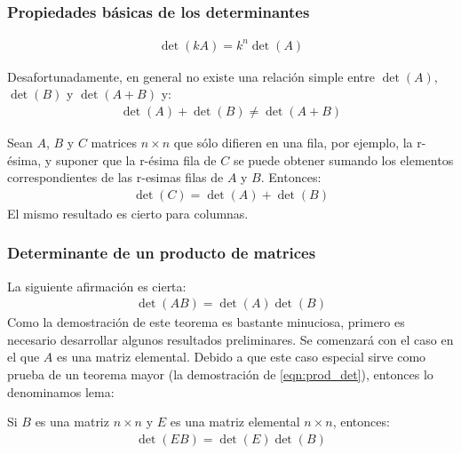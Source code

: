 \documentclass[a4paper,12pt]{article}
\begin{document}
\subsubsection{Propiedades básicas de los determinantes}

\begin{concept}
  \begin{align*}
    \det(kA)=k^n\det(A)
  \end{align*}
\end{concept}

Desafortunadamente, en general no existe una relación simple entre
$\det(A)$, $\det(B)$ y $\det(A+B)$ y:
\begin{align*}
  \det(A) + \det(B) \ne \det(A+B)
\end{align*}

\begin{theorem}
  Sean $A$, $B$ y $C$ matrices $n\times n$ que sólo difieren en una fila, por
  ejemplo, la r-ésima, y suponer que la r-ésima fila de $C$ se puede obtener
  sumando los elementos correspondientes de las r-esimas filas de $A$ y
  $B$. Entonces:
  \begin{align*}
    \det(C)=\det(A)+\det(B)
  \end{align*}
  El mismo resultado es cierto para columnas.
  \label{theo:det_suma}
\end{theorem}

\subsubsection{Determinante de un producto de matrices}

La siguiente afirmación es cierta:
\begin{align}
  \det(AB)=\det(A)\det(B)
  \label{eqn:prod_det}
\end{align}
Como la demostración de este teorema es bastante minuciosa, primero es
necesario desarrollar algunos resultados preliminares. Se comenzará con el
caso en el que $A$ es una matriz elemental. Debido a que este caso especial
sirve como prueba de un teorema mayor (la demostración de
\eqref{eqn:prod_det}), entonces lo denominamos lema:

\begin{lemma}
  Si $B$ es una matriz $n\times n$ y $E$ es una matriz elemental $n\times n$,
  entonces:
  \begin{align*}
    \det(EB)=\det(E)\det(B)
  \end{align*}
  \label{lem:prod_det_1}
\end{lemma}
\end{document}
